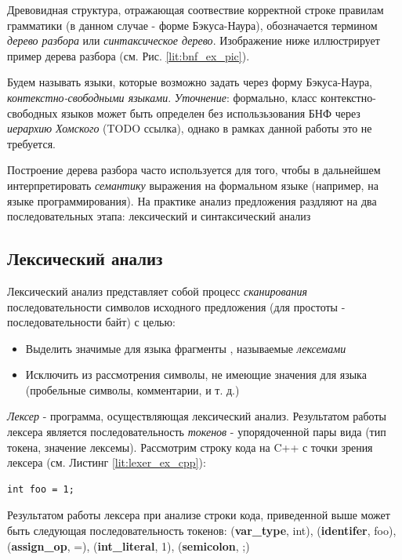 Древовидная структура, отражающая соотвествие корректной строке правилам грамматики (в данном случае - форме Бэкуса-Наура), обозначается термином \textit{дерево разбора} или \textit{синтаксическое дерево}. Изображение ниже иллюстрирует пример дерева разбора (см. Рис. \ref{lit:bnf_ex_pic}). 

Будем называть языки, которые возможно задать через форму Бэкуса-Наура, \textit{контекстно-свободными языками}. \textit{Уточнение}: формально, класс контекстно-свободных языков может быть определен без использьзования БНФ через \textit{иерархию Хомского} (TODO ссылка), однако в рамках данной работы это не требуется.

Построение дерева разбора часто используется для того, чтобы в дальнейшем интерпретировать \textit{семантику} выражения на формальном языке (например, на языке программирования). На практике анализ предложения раздляют на два последовательных этапа: лексический и синтаксический анализ

\subsection{Лексический анализ}
Лексический анализ представляет собой процесс \textit{сканирования} последовательности символов исходного предложения (для простоты - последовательности байт) с целью:

\begin{itemize}
    \item Выделить значимые для языка фрагменты , называемые \textit{лексемами}
    \item Исключить из рассмотрения символы, не имеющие значения для языка (пробельные символы, комментарии, и т. д.)
\end{itemize}

\textit{Лексер} - программа, осуществляющая лексический анализ. Результатом работы лексера является последовательность \textit{токенов} - упорядоченной пары вида (тип токена, значение лексемы). Рассмотрим строку кода на C++ с точки зрения лексера (см. Листинг \ref{lit:lexer_ex_cpp}):

\begin{code}
\label{lit:lexer_ex_cpp}
\begin{verbatim}
int foo = 1;
\end{verbatim}
\end{code}

Результатом работы лексера при анализе строки кода, приведенной выше может быть следующая последовательность токенов: (\textbf{var\_type}, int), (\textbf{identifer}, foo), (\textbf{assign\_op}, =), (\textbf{int\_literal}, 1), (\textbf{semicolon}, ;)

